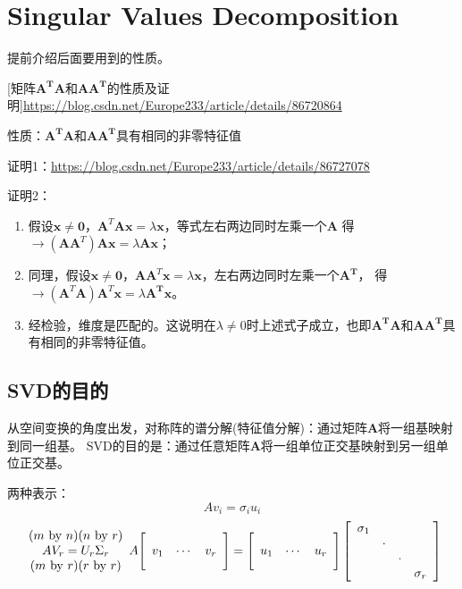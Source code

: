 \section{Singular Values Decomposition}
提前介绍后面要用到的性质。

[矩阵$\bm{A^TA}$和$\bm{AA^T}$的性质及证明]\url{https://blog.csdn.net/Europe233/article/details/86720864}

性质：$\bm{A^TA}$和$\bm{AA^T}$具有相同的非零特征值

证明1：\url{https://blog.csdn.net/Europe233/article/details/86727078}

证明2：
\begin{enumerate}
    \item 假设$\bm{x} \neq \bm{0}$，$\bm{A}^T\bm{Ax}=\lambda \bm{x}$，等式左右两边同时左乘一个$\bm{A}$
    得$\bm{\rightarrow} (\bm{AA}^T)\bm{Ax}=\lambda \bm{Ax}$；
    \item 同理，假设$\bm{x} \neq \bm{0}$，$\bm{AA}^T\bm{x}=\lambda \bm{x}$，左右两边同时左乘一个$\bm{A^T}$，
    得$\bm{\rightarrow} (\bm{A}^T\bm{A})\bm{A}^T\bm{x}=\lambda \bm{A^T}\bm{x}$。
    \item 经检验，维度是匹配的。这说明在$\lambda \neq 0$时上述式子成立，也即$\bm{A^TA}$和$\bm{AA^T}$具有相同的非零特征值。
\end{enumerate}

\subsection{SVD的目的}
从空间变换的角度出发，对称阵的谱分解(特征值分解)：通过矩阵$\bm{A}$将一组基映射到同一组基。
SVD的目的是：通过任意矩阵$\bm{A}$将一组单位正交基映射到另一组单位正交基。

两种表示：
$$A v_{i}=\sigma_{i} u_{i}$$
$$\begin{array}{c}
(m \text { by } n)(n \text { by } r) \\
A V_{r}=U_{r} \Sigma_{r} \\
(m \text { by } r)(r \text { by } r)
\end{array}
\\
A\Bigg[\begin{array}{lll}
v_{1} & \cdots & v_{r}
\end{array}\Bigg]=\Bigg[\begin{array}{lll}
u_{1} & \cdots & u_{r}
\end{array}\Bigg]\left[\begin{array}{cccc}
\sigma_{1} & & & \\
& \cdot & \\
& & \cdot & \\
& & & \sigma_{r}
\end{array}\right]$$


